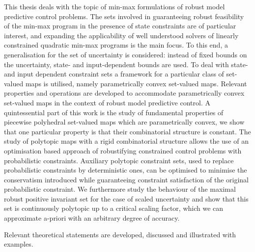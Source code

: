 
This thesis deals with the topic of min-max formulations of robust model predictive control problems.
%
The sets involved in guaranteeing robust feasibility of the min-max program in the presence of state constraints are of particular interest, and expanding the applicability of well understood solvers of linearly constrained quadratic min-max programs is the main focus. 
%
To this end, a generalisation for the set of uncertainty is considered: instead of fixed bounds on the uncertainty, state- and input-dependent bounds are used. 
%
To deal with state- and input dependent constraint sets a framework for a particular class of set-valued maps is utilised, namely parametrically convex set-valued maps.
%
Relevant properties and operations are developed to accommodate parametrically convex set-valued maps in the context of robust model predictive control. 
%
A quintessential part of this work is the study of fundamental properties of piecewise polyhedral set-valued maps which are parametrically convex, we show that one particular property is that their combinatorial structure is constant.
%
The study of polytopic maps with a rigid combinatorial structure allows the use of an optimisation based approach of robustifying constrained control problems with probabilistic constraints.
%
Auxiliary polytopic constraint sets, used to replace probabilistic constraints by deterministic ones, can be optimised to minimise the conservatism introduced while guaranteeing constraint satisfaction of the original probabilistic constraint.
%
We furthermore study the behaviour of the maximal robust positive invariant set for the case of scaled uncertainty and show that this set is continuously polytopic up to a critical scaling factor, which we can approximate a-priori with an arbitrary degree of accuracy.

\hspace{1em} Relevant theoretical statements are developed, discussed and illustrated with examples.